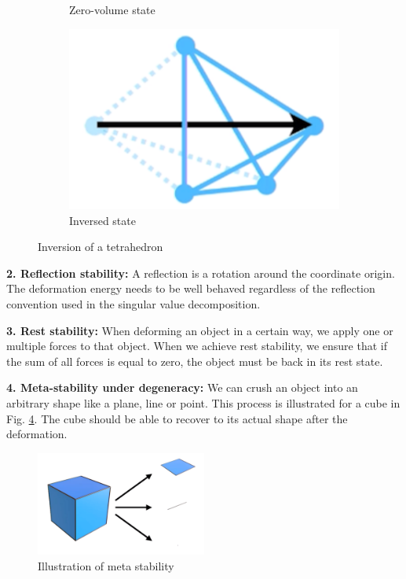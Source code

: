 \begin{figure}[!ht]
\begin{subfigure}{.3\textwidth}
  \caption{Zero-volume state}
  \label{fig:inversion_2}
\end{subfigure}
\begin{subfigure}{.3\textwidth}
  \centering
  \includegraphics[width=.8\linewidth]{resources/inversion_3}  
  \caption{Inversed state}
  \label{fig:inversion_3}
\end{subfigure}
\caption{Inversion of a tetrahedron {\cite{STREAM2018}}}
\label{fig:inversion}
\end{figure}


\textbf{2. Reflection stability:} A reflection is a rotation around the coordinate origin. The deformation energy needs to be well behaved regardless of the reflection convention used in the singular value decomposition.

\textbf{3. Rest stability:} When deforming an object in a certain way, we apply one or multiple forces to that object. When we achieve rest stability, we ensure that if the sum of all forces is equal to zero, the object must be back in its rest state.

\textbf{4. Meta-stability under degeneracy:} We can crush an object into an arbitrary shape like a plane, line or point. This process is illustrated for a cube in Fig. \ref{fig:meta_stability}. The cube should be able to recover to its actual shape after the deformation.

\begin{figure}[!htbp]
	\centering
	\includegraphics[width=0.5\textwidth]{resources/meta_stability}
	\caption{Illustration of meta stability {\cite{STREAM2018}}}
	\label{fig:meta_stability}
\end{figure}

